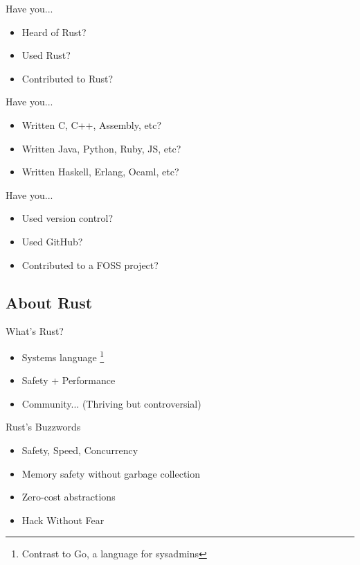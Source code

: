 \documentclass[50pt]{beamer}
\begin{document}
\begin{frame}
    Have you...
    \begin{itemize}
        \item Heard of Rust?
        \item Used Rust?
        \item Contributed to Rust?
    \end{itemize}
\end{frame}

\begin{frame}
    Have you...
    \begin{itemize}
        \item Written C, C++, Assembly, etc?
        \item Written Java, Python, Ruby, JS, etc?
        \item Written Haskell, Erlang, Ocaml, etc?
    \end{itemize}
\end{frame}

\begin{frame}
    Have you...
    \begin{itemize}
        \item Used version control?
        \item Used GitHub?
        \item Contributed to a FOSS project?
    \end{itemize}
\end{frame}

\subsection{About Rust}

\begin{frame}
    What's Rust?
    \begin{itemize}
        \item Systems language \footnote{Contrast to Go, a language for sysadmins}
        \item Safety + Performance
        \item Community... (Thriving but controversial)
    \end{itemize}
\end{frame}

\begin{frame}
    Rust's Buzzwords
    \begin{itemize}
        \item Safety, Speed, Concurrency
        \item Memory safety without garbage collection
        \item Zero-cost abstractions
        \item Hack Without Fear
    \end{itemize}
\end{frame}
\end{document}
